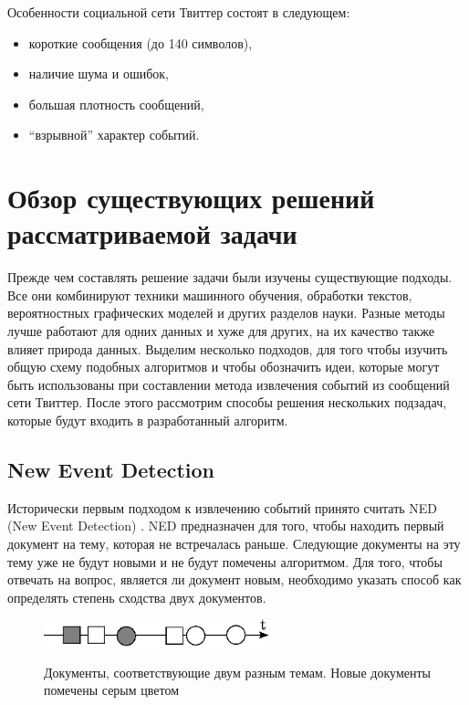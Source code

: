 \documentclass[14pt,a4paper,oneside]{extarticle}
\newcommand\todo[1]{\marginpar{\textcolor{red}{#1}}}
\begin{document}
  Особенности социальной сети Твиттер состоят в следующем:
  \begin{itemize}
  \item короткие сообщения (до 140 символов),
  \item наличие шума и ошибок,
  \item большая плотность сообщений,
  \item ``взрывной'' характер событий.
  \end{itemize}
  
  \section{Обзор существующих решений рассматриваемой задачи}
  Прежде чем составлять решение задачи были изучены существующие подходы. Все они комбинируют техники машинного обучения, обработки текстов, вероятностных графических моделей и других разделов науки. Разные методы лучше работают для одних данных и хуже для других, на их качество также влияет природа данных. Выделим несколько подходов, для того чтобы изучить общую схему подобных алгоритмов и чтобы обозначить идеи, которые могут быть использованы при составлении метода извлечения событий из сообщений сети Твиттер. После этого рассмотрим способы решения нескольких подзадач, которые будут входить в разработанный алгоритм.
  
  
  \subsection{New Event Detection}
  \label{ned-subsection}
	Исторически первым подходом к извлечению событий принято считать NED (New Event Detection) \cite{ned}. NED предназначен для того, чтобы находить первый документ на тему, которая не встречалась раньше. Следующие документы на эту тему уже не будут новыми и не будут помечены алгоритмом. Для того, чтобы отвечать на вопрос, является ли документ новым, необходимо указать способ как определять степень сходства двух документов.
	
\begin{figure}[H]
  \centering
  \includegraphics[width=0.58\textwidth]{ned.eps}
  \\
  \caption{Документы, соответствующие двум разным темам. Новые документы помечены серым цветом}
  \end{figure}  
\end{document}

